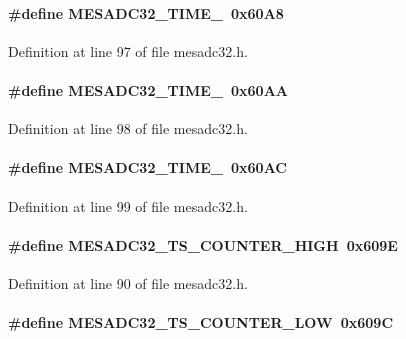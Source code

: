 \paragraph[{MESADC32\_\-TIME\_\-0}]{\setlength{\rightskip}{0pt plus 5cm}\#define MESADC32\_\-TIME\_~0x60A8}\hfill\label{mesadc32_8h_a0389b73bd36d1fe09f38f3baa9435acb}


Definition at line 97 of file mesadc32.h.
\paragraph[{MESADC32\_\-TIME\_\-1}]{\setlength{\rightskip}{0pt plus 5cm}\#define MESADC32\_\-TIME\_~0x60AA}\hfill\label{mesadc32_8h_a10f08e868d8dadd87fc736a32a5a558e}


Definition at line 98 of file mesadc32.h.
\paragraph[{MESADC32\_\-TIME\_\-2}]{\setlength{\rightskip}{0pt plus 5cm}\#define MESADC32\_\-TIME\_~0x60AC}\hfill\label{mesadc32_8h_aa1768709aadb3bdda787df150bfac18d}


Definition at line 99 of file mesadc32.h.
\paragraph[{MESADC32\_\-TS\_\-COUNTER\_\-HIGH}]{\setlength{\rightskip}{0pt plus 5cm}\#define MESADC32\_\-TS\_\-COUNTER\_\-HIGH~0x609E}\hfill\label{mesadc32_8h_a24b083ddccdad35e5e9bbdf4323c4df4}


Definition at line 90 of file mesadc32.h.
\paragraph[{MESADC32\_\-TS\_\-COUNTER\_\-LOW}]{\setlength{\rightskip}{0pt plus 5cm}\#define MESADC32\_\-TS\_\-COUNTER\_\-LOW~0x609C}\hfill\label{mesadc32_8h_a0ba59ba89f52fb5169a267d6d6827940}


